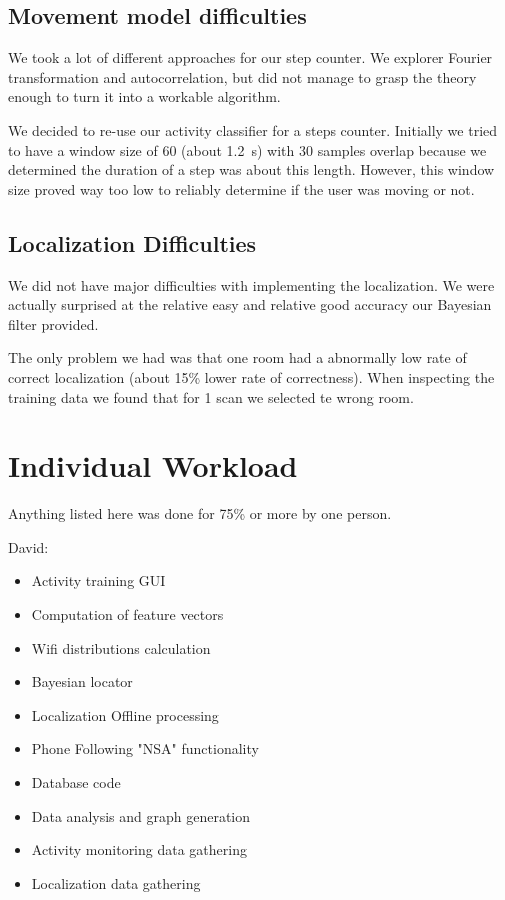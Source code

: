 \documentclass[a4paper,10pt,twoside]{IEEEtran}
\begin{document}
\subsection{Movement model difficulties}

We took a lot of different approaches for our step counter.
We explorer Fourier transformation and autocorrelation, but did not manage to grasp the theory enough to turn it into a workable algorithm.

We decided to re-use our activity classifier for a steps counter.
Initially we tried to have a window size of 60 (about 1.2~s) with 30 samples overlap because we determined the duration of a step was about this length.
However, this window size proved way too low to reliably determine if the user was moving or not.

\subsection{Localization Difficulties}

We did not have major difficulties with implementing the localization.
We were actually surprised at the relative easy and relative good accuracy our Bayesian filter provided.

The only problem we had was that one room had a abnormally low rate of correct localization (about 15\% lower rate of correctness).
When inspecting the training data we found that for 1 scan we selected te wrong room.

\section{Individual Workload}
\label{sec:individual-workload}
Anything listed here was done for 75\% or more by one person.

David:
\begin{itemize}
	\item Activity training GUI
    \item Computation of feature vectors
    \item Wifi distributions calculation
    \item Bayesian locator
    \item Localization Offline processing
    \item Phone Following "NSA" functionality
    \item Database code
    \item Data analysis and graph generation
    \item Activity monitoring data gathering
    \item Localization data gathering
\end{itemize}
\end{document}
